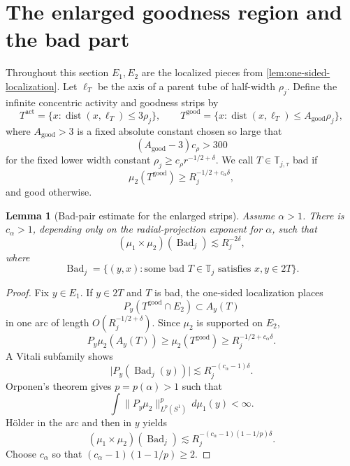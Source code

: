 \documentclass[11pt,letterpaper]{amsart}
\newtheorem{lemma}[lemma]{Lemma}
\newcommand{\dist}{\operatorname{dist}}
\newcommand{\abs}[1]{\lvert#1\rvert}
\newcommand{\norm}[1]{\lVert#1\rVert}
\begin{document}
\section{The enlarged goodness region and the bad part}
\label{sec:bad}

Throughout this section \(E_1,E_2\) are the localized pieces from
\cref{lem:one-sided-localization}.  Let \(\ell_T\) be the axis of a parent
tube of half-width \(\rho_j\).  Define the infinite concentric activity and
goodness strips by
\[
 T^{\mathrm{act}}
 =\{x:\dist(x,\ell_T)\le3\rho_j\},\qquad
 T^{\mathrm{good}}
 =\{x:\dist(x,\ell_T)\le A_{\mathrm{good}}\rho_j\},
\]
where \(A_{\mathrm{good}}>3\) is a fixed absolute constant chosen so large
that
\begin{equation}\label{eq:Agood-choice}
 (A_{\mathrm{good}}-3)c_\rho>300
\end{equation}
for the fixed lower width constant
\(\rho_j\ge c_\rho r^{-1/2+\delta}\).
We call \(T\in\mathbb T_{j,\tau}\) bad if
\begin{equation}\label{eq:bad-definition}
 \mu_2(T^{\mathrm{good}})
 \ge R_j^{-1/2+c_\alpha\delta},
\end{equation}
and good otherwise.

\begin{lemma}[Bad-pair estimate for the enlarged strips]
\label{lem:bad-pair}
Assume \(\alpha>1\).  There is \(c_\alpha>1\), depending only on the
radial-projection exponent for \(\alpha\), such that
\begin{equation}\label{eq:bad-pair}
 (\mu_1\times\mu_2)(\operatorname{Bad}_j)
 \lesssim R_j^{-2\delta},
\end{equation}
where
\[
 \operatorname{Bad}_j
 =\{(y,x):\text{some bad }T\in\mathbb T_j
                 \text{ satisfies }x,y\in2T\}.
\]
\end{lemma}

\begin{proof}
Fix \(y\in E_1\).  If \(y\in2T\) and \(T\) is bad, the one-sided
localization places
\[
 P_y(T^{\mathrm{good}}\cap E_2)
 \subset A_y(T)
\]
in one arc of length \(O(R_j^{-1/2+\delta})\).  Since \(\mu_2\) is supported
on \(E_2\),
\[
 P_y\mu_2(A_y(T))
 \ge\mu_2(T^{\mathrm{good}})
 \ge R_j^{-1/2+c_\alpha\delta}.
\]
A Vitali subfamily shows
\[
 \abs{P_y(\operatorname{Bad}_j(y))}
 \lesssim R_j^{-(c_\alpha-1)\delta}.
\]
Orponen's theorem gives \(p=p(\alpha)>1\) such that
\[
 \int\norm{P_y\mu_2}_{L^p(S^1)}^p\,d\mu_1(y)<\infty.
\]
H\"older in the arc and then in \(y\) yields
\[
 (\mu_1\times\mu_2)(\operatorname{Bad}_j)
 \lesssim
 R_j^{-(c_\alpha-1)(1-1/p)\delta}.
\]
Choose \(c_\alpha\) so that
\((c_\alpha-1)(1-1/p)\ge2\).
\end{proof}
\end{document}
